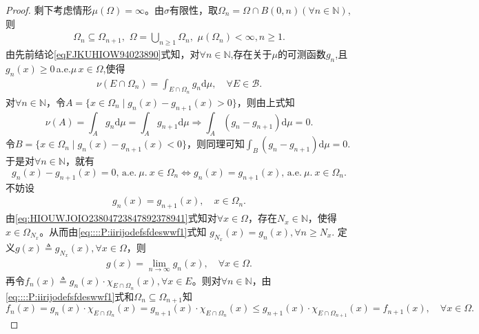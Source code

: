 \documentclass[../../main.tex]{subfiles}%
\begin{document}
\begin{proof}
剩下考虑情形$\mu(\Omega)=\infty$。由$\sigma$有限性，取$\Omega_n=\Omega\cap B(0,n)(\forall n\in \mathbb{N})$,则
\begin{align*}
\Omega _n\subseteq \Omega _{n+1},\,\,\Omega =\bigcup_{n\geqslant 1}{\Omega _n,}\,\,\mu (\Omega _n)<\infty ,n\geqslant 1.
\end{align*}
由先前结论\eqref{eqFJKUHIOW94023890}式知，对$\forall n\in \mathbb{N}$,存在关于$\mu$的可测函数$g_n$,且$g_n(x)\geqslant 0\,$a.e.$\mu\,x\in \Omega$,使得
\begin{align}\label{eq:HIOUWJOIO2380472384789237894}
\nu(E\cap\Omega_n)=\int_{E\cap\Omega_n}g_n\mathrm{d}\mu,\quad \forall E\in\mathcal{B}.
\end{align}
对$\forall n\in \mathbb{N}$，令$A=\{ x\in \Omega _n\mid g_n\left( x \right) -g_{n+1}\left( x \right) >0 \}$，则由上式知
$$\nu \left( A \right) =\int_A{g_n\mathrm{d}\mu}=\int_A{g_{n+1}\mathrm{d}\mu}\Longrightarrow \int_A{\left( g_n-g_{n+1} \right) \mathrm{d}\mu}=0.$$
令$B=\{ x\in \Omega _n\mid g_n\left( x \right) -g_{n+1}\left( x \right) <0 \}$，则同理可知$\int_B{\left( g_n-g_{n+1} \right) \mathrm{d}\mu}=0.$于是对$\forall n\in \mathbb{N}$，就有
$$g_n\left( x \right) -g_{n+1}\left( x \right) =0,\,\mathrm{a}.\mathrm{e}.\ \mu.\ x\in \Omega _n\Longleftrightarrow g_n\left( x \right) =g_{n+1}\left( x \right),\, \mathrm{a}.\mathrm{e}.\ \mu.\ x\in \Omega _n.$$
不妨设
\begin{align}
g_n\left( x \right) =g_{n+1}\left( x \right),\quad x\in \Omega _n.\label{eq::::P:iirijodefsfdeswwf1}
\end{align}
由\eqref{eq:HIOUWJOIO23804723847892378941}式知对$\forall x\in \Omega$，存在$N_x\in \mathbb{N}$，使得$x\in \Omega _{N_x}$。从而由\eqref{eq::::P:iirijodefsfdeswwf1}式知
$g_{N_x}\left( x \right) =g_n\left( x \right),\forall n\geqslant N_x.$
定义$g\left( x \right) \triangleq g_{N_x}\left( x \right),\forall x\in \Omega$，则
\begin{align}
g\left( x \right) =\lim\limits_{n\rightarrow \infty}g_n\left( x \right),\quad \forall x\in \Omega.\label{eq::::P:iirijodefsfdeswwf2}
\end{align}
再令$f_n\left( x \right) \triangleq g_n\left( x \right) \cdot \chi _{E\cap \Omega _n}\left( x \right),\forall x\in E$。则对$\forall n\in \mathbb{N}$，由\eqref{eq::::P:iirijodefsfdeswwf1}式和$\Omega _n\subseteq \Omega _{n+1}$知
$$f_n\left( x \right) =g_n\left( x \right) \cdot \chi _{E\cap \Omega _n}\left( x \right) =g_{n+1}\left( x \right) \cdot \chi _{E\cap \Omega _n}\left( x \right) \leqslant g_{n+1}\left( x \right) \cdot \chi _{E\cap \Omega _{n+1}}\left( x \right) =f_{n+1}\left( x \right),\quad \forall x\in \Omega.$$

\end{proof}
\end{document}

